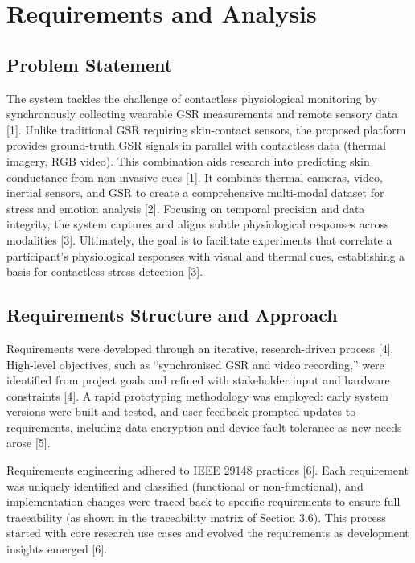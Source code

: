 
\chapter{Requirements and Analysis}
\label{ch:requirements}


\section{Problem Statement}

The system tackles the challenge of contactless physiological monitoring by synchronously collecting wearable GSR measurements and remote sensory data [1]. Unlike traditional GSR requiring skin-contact sensors, the proposed platform provides ground-truth GSR signals in parallel with contactless data (thermal imagery, RGB video). This combination aids research into predicting skin conductance from non-invasive cues [1]. It combines thermal cameras, video, inertial sensors, and GSR to create a comprehensive multi-modal dataset for stress and emotion analysis [2]. Focusing on temporal precision and data integrity, the system captures and aligns subtle physiological responses across modalities [3]. Ultimately, the goal is to facilitate experiments that correlate a participant's physiological responses with visual and thermal cues, establishing a basis for contactless stress detection [3].


\section{Requirements Structure and Approach}

Requirements were developed through an iterative, research-driven process [4]. High-level objectives, such as “synchronised GSR and video recording,” were identified from project goals and refined with stakeholder input and hardware constraints [4]. A rapid prototyping methodology was employed: early system versions were built and tested, and user feedback prompted updates to requirements, including data encryption and device fault tolerance as new needs arose [5].

Requirements engineering adhered to IEEE 29148 practices [6]. Each requirement was uniquely identified and classified (functional or non-functional), and implementation changes were traced back to specific requirements to ensure full traceability (as shown in the traceability matrix of Section 3.6). This process started with core research use cases and evolved the requirements as development insights emerged [6].



